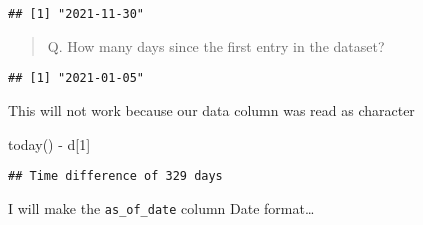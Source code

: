 \documentclass[
]{article}
\newenvironment{Shaded}{\begin{snugshade}}{\end{snugshade}}
\newcommand{\CommentTok}[1]{\textcolor[rgb]{0.56,0.35,0.01}{\textit{#1}}}
\newcommand{\DecValTok}[1]{\textcolor[rgb]{0.00,0.00,0.81}{#1}}
\newcommand{\FunctionTok}[1]{\textcolor[rgb]{0.00,0.00,0.00}{#1}}
\newcommand{\NormalTok}[1]{#1}
\newcommand{\OtherTok}[1]{\textcolor[rgb]{0.56,0.35,0.01}{#1}}
\newcommand{\SpecialCharTok}[1]{\textcolor[rgb]{0.00,0.00,0.00}{#1}}
\begin{document}
\begin{verbatim}
## [1] "2021-11-30"
\end{verbatim}

\begin{quote}
Q. How many days since the first entry in the dataset?
\end{quote}

\begin{Shaded}
\end{Shaded}

\begin{verbatim}
## [1] "2021-01-05"
\end{verbatim}

This will not work because our data column was read as character

\begin{Shaded}
\end{Shaded}

\begin{Shaded}
\end{Shaded}

\begin{Shaded}
\begin{Highlighting}[]
\FunctionTok{today}\NormalTok{() }\SpecialCharTok{{-}}\NormalTok{ d[}\DecValTok{1}\NormalTok{]}
\end{Highlighting}
\end{Shaded}

\begin{verbatim}
## Time difference of 329 days
\end{verbatim}

I will make the \texttt{as\_of\_date} column Date format\ldots{}

\begin{Shaded}
\end{Shaded}
\end{document}
